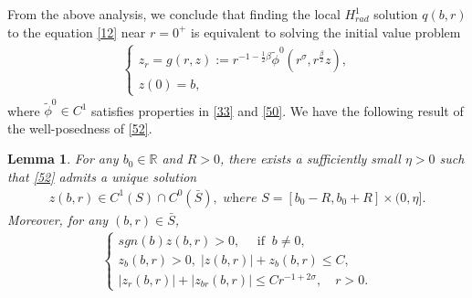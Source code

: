 \documentclass[12pt]{amsart}
\newcommand{\R}{\mathbb R}
\newtheorem{lemma}[theorem]{Lemma}
\begin{document}
From the above analysis, we conclude that finding the local $H_{rad}^1$ solution $q(b, r)$ to the equation \eqref{12} near $r=0^+$ is equivalent to solving the initial value problem 
\begin{align}\label{52}
\begin{cases}
z_r=g(r,z):=r^{-1-\frac 12\beta}\tilde \phi^0(r^\sigma, r^{\frac \beta 2} z), \\
z(0)=b, 
\end{cases}
\end{align}
where $\tilde \phi^0\in C^1$ satisfies properties in \eqref{33} and \eqref{50}. 
We have the following result of the well-posedness of \eqref{52}.

\begin{lemma}\label{lm: z}
For any $b_0 \in \R$ and $R>0$, there exists a sufficiently small $\eta>0$ such that \eqref{52} admits a unique solution 
\begin{align*}
z(b,r)\in C^1(S) \cap C^0 (\bar S), 
\textit{ where } S = [b_0-R, b_0+R] \times (0, \eta].
\end{align*}
Moreover, for any $(b, r)\in \bar S$, 
\begin{align}\label{53}
\begin{cases}
sgn (b) z(b,r)>0,\quad \text{ if } \ b\ne 0, \\
z_b(b,r)>0, \; |z(b,r)|+z_b(b,r)\le C, \\
|z_r(b,r)|+|z_{br}(b,r)|\le C r^{-1+2\sigma}, \quad r>0. 
\end{cases}
\end{align}
\end{lemma}
\end{document}
